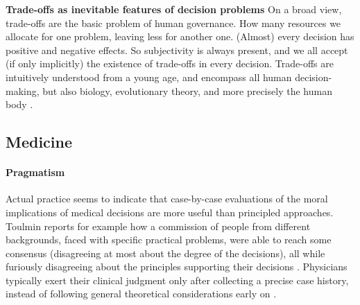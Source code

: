 \textbf{Trade-offs as inevitable features of decision problems}
On a broad view, trade-offs are the basic problem of human governance.
How many resources we allocate for one problem, leaving less for another one.
(Almost) every decision has positive and negative effects.
So subjectivity is always present, and we all accept (if only implicitly) the existence of trade-offs in every decision. 
Trade-offs are intuitively understood from a young age, and encompass all human decision-making, but also biology, evolutionary theory, and more precisely the human body \cite{Launer2020}.



\subsection{Medicine}

    \paragraph{Pragmatism}
    Actual practice seems to indicate that case-by-case evaluations of the moral implications of medical decisions are more useful than principled approaches.
    Toulmin reports for example how a commission of people from different backgrounds, faced with specific practical problems, were able to reach some consensus (disagreeing at most about the degree of the decisions), all while furiously disagreeing about the principles supporting their decisions \cite{Toulmin1982}.
    Physicians typically exert their clinical judgment only after collecting a precise case history, instead of following general theoretical considerations early on \cite{Toulmin1982}.
